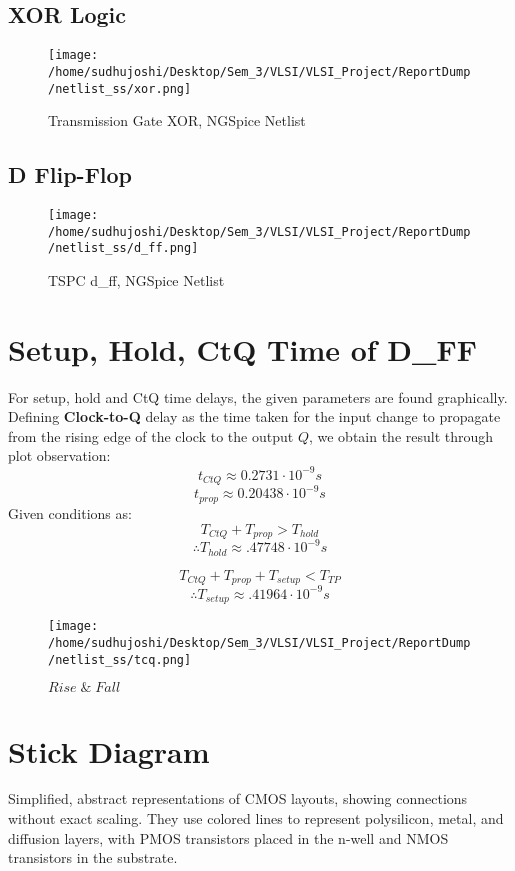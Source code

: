 \documentclass[conference]{IEEEtran}
\begin{document}
\subsection{XOR Logic}
\begin{figure}[H] 
    \centering
    \texttt{[image: /home/sudhujoshi/Desktop/Sem\_3/VLSI/VLSI\_Project/ReportDump/netlist\_ss/xor.png]}
    \caption{Transmission Gate XOR, NGSpice Netlist}
\end{figure}


\subsection{D Flip-Flop}
\begin{figure}[H] 
    \centering
    \texttt{[image: /home/sudhujoshi/Desktop/Sem\_3/VLSI/VLSI\_Project/ReportDump/netlist\_ss/d\_ff.png]}
    \caption{TSPC d\_ff, NGSpice Netlist} 
\end{figure}



\section{Setup, Hold, CtQ Time of D\_FF}
For setup, hold and CtQ time delays, the given parameters are found graphically.
\\
Defining \textbf{Clock-to-Q} delay as the time taken for the input change to propagate from the rising edge of the clock to the output \( Q \), we obtain the result through plot observation: 
\[
t_{CtQ} \approx 0.2731\cdot10^{-9}s
\]
\[
t_{prop} \approx 0.20438\cdot10^{-9}s
\]
Given conditions as:
\[
T_{CtQ} + T_{prop} > T_{hold}
\]
\[
\therefore T_{hold} \approx .47748\cdot10^{-9}s
\]

\[
T_{CtQ} + T_{prop} + T_{setup} < T_{TP}
\]
\[
\therefore T_{setup} \approx .41964\cdot10^{-9}s
\]

\begin{figure}[H] 
    \centering
    \texttt{[image: /home/sudhujoshi/Desktop/Sem\_3/VLSI/VLSI\_Project/ReportDump/netlist\_ss/tcq.png]}
    \caption{$Rise\;\&\;Fall$}
\end{figure}

\section{Stick Diagram}
Simplified, abstract representations of CMOS layouts, showing connections without 
exact scaling. They use colored lines to represent polysilicon, metal, and diffusion 
layers, with PMOS transistors placed in the n-well and NMOS transistors in the 
substrate.
\end{document}
